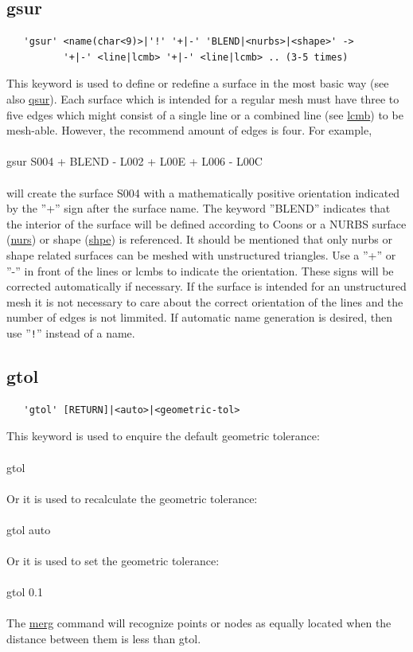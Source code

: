 \documentclass{article}
\providecommand{\htmlref}[2]{\hyperref[#2]{#1}}
\begin{document}
\subsection{\label{gsur}gsur}
\begin{verbatim}
   'gsur' <name(char<9)>|'!' '+|-' 'BLEND|<nurbs>|<shape>' ->
          '+|-' <line|lcmb> '+|-' <line|lcmb> .. (3-5 times)
\end{verbatim}
This keyword is used to define or redefine a surface in the most basic way (see also \htmlref{qsur}{qsur}). Each surface which is intended for a regular mesh must have three to five edges which might consist of a single line or a combined line (see \htmlref{lcmb}{lcmb}) to be mesh-able. However, the recommend amount of edges is four. For example,\\\\gsur S004 + BLEND  - L002 + L00E + L006 - L00C\\\\will create the surface S004 with a mathematically positive orientation indicated by the ''+'' sign after the surface name. The keyword ''BLEND'' indicates that the interior of the surface will be defined according to Coons \cite{Coons} or a NURBS surface (\htmlref{nurs}{nurs}) or shape (\htmlref{shpe}{shpe}) is referenced. It should be mentioned that only nurbs or shape related surfaces can be meshed with unstructured triangles. Use a  ''+'' or ''-'' in front of the lines or lcmbs to indicate the orientation. These signs will be corrected automatically if necessary. If the surface is intended for an unstructured mesh it is not necessary to care about the correct orientation of the lines and the number of edges is not limmited. If automatic name generation is desired, then use ''\verb_!_'' instead of a name.

\subsection{\label{gtol}gtol}
\begin{verbatim}
   'gtol' [RETURN]|<auto>|<geometric-tol>
\end{verbatim}
This keyword is used to enquire the default geometric tolerance:\\\\
gtol\\\\
Or it is used to recalculate the geometric tolerance:\\\\
gtol auto\\\\
Or it is used to set the geometric tolerance:\\\\
gtol 0.1\\\\
The \htmlref{merg}{merg} command will recognize points or nodes as equally located when the distance between them is less than gtol.
\end{document}

